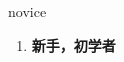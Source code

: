 
\begin{frame}
{\huge novice}
\begin{center}
\begin{enumerate}\Large
  \item \textbf{新手，初学者}
\end{enumerate}
\end{center}
\end{frame}
